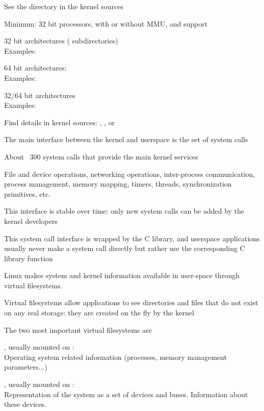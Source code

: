   \startitemize
  \item See the  directory in the kernel sources
  \item Minimum: 32 bit processors, with or without MMU, and
     support
  \item 32 bit architectures ( subdirectories)\\
    Examples: 
  \item 64 bit architectures:\\
    Examples: 
  \item 32/64 bit architectures\\
    Examples: 
  \item Find details in kernel sources: ,
    , or 
  \stopitemize

  \startitemize
  \item The main interface between the kernel and userspace is the set
    of system calls
  \item About ~300 system calls that provide the main kernel services
    \startitemize
    \item File and device operations, networking operations,
      inter-process communication, process management, memory mapping,
      timers, threads, synchronization primitives, etc.
    \stopitemize
  \item This interface is stable over time: only new system calls can
    be added by the kernel developers
  \item This system call interface is wrapped by the C library, and
    userspace applications usually never make a system call directly
    but rather use the corresponding C library function
  \stopitemize

  \startitemize
  \item Linux makes system and kernel information available in
    user-space through virtual filesystems.
  \item Virtual filesystems allow applications to see directories and
    files that do not exist on any real storage: they are created on the
    fly by the kernel
  \item The two most important virtual filesystems are
    \startitemize
    \item {}, usually mounted on : \\
      Operating system related information (processes, memory
      management parameters...)
    \item {}, usually mounted on : \\
       Representation of the system as a set of
       devices and buses. Information about these devices.
    \stopitemize
  \stopitemize
